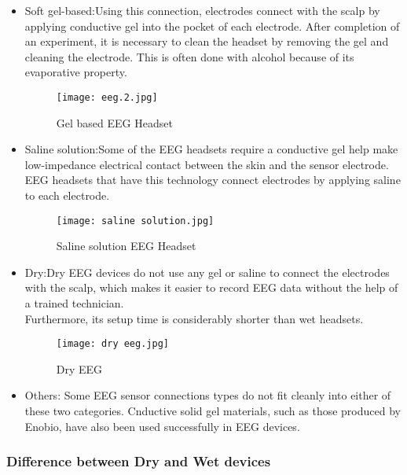 \documentclass[12pt,a4paper]{article}
\begin{document}
\begin{itemize}

\item Soft gel-based:Using this connection, electrodes connect with the scalp by applying conductive gel into the pocket of each electrode. After completion of an experiment, it is necessary to clean the headset by removing the gel and cleaning the electrode. This is often done with alcohol because of its evaporative property.
\begin{figure}[h]
\centering
\texttt{[image: eeg.2.jpg]}
\caption{Gel based EEG Headset}
\end{figure}

\item Saline solution:Some of the EEG  headsets require a conductive gel help make low-impedance electrical contact between the skin and the sensor electrode. EEG headsets that have this technology connect electrodes by applying saline to each electrode.

\begin{figure}[h]
\centering
\texttt{[image: saline solution.jpg]}
\caption{Saline solution EEG Headset}
\end{figure}


\item Dry:Dry EEG devices do not use any gel or saline to connect the electrodes with the scalp, which makes it easier to record EEG data without the help of a trained technician.\\Furthermore, its setup time is considerably shorter than wet headsets.


\begin{figure}[h]
\centering
\texttt{[image: dry eeg.jpg]}
\caption{Dry EEG}
\end{figure}

\item Others: Some EEG sensor connections types do not fit cleanly into either of these two categories. Cnductive solid gel materials, such as those produced by Enobio, have also been used successfully in EEG devices.

\end{itemize}

\subsubsection{Difference between Dry and Wet devices}
\end{document}
